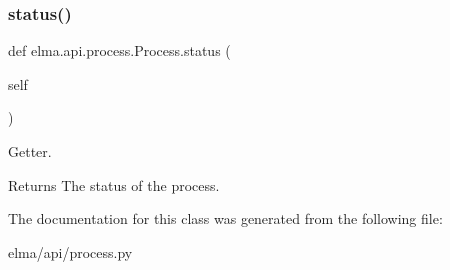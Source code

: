 \subsubsection{\texorpdfstring{status()}{status()}}
{\footnotesize\ttfamily def elma.\+api.\+process.\+Process.\+status (\begin{DoxyParamCaption}\item[{}]{self }\end{DoxyParamCaption})}



Getter. 

\begin{DoxyReturn}{Returns}
The status of the process. 
\end{DoxyReturn}


The documentation for this class was generated from the following file\+:\begin{DoxyCompactItemize}
\item 
elma/api/process.\+py\end{DoxyCompactItemize}
